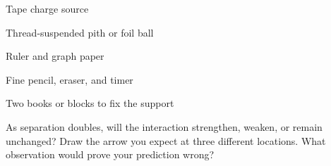 \newcommand{\fieldcomparison}{%
\begin{center}
\begin{tikzpicture}[x=.92cm,y=.92cm,line cap=round,
  arrow/.style={-{Latex[length=1.5mm]},black!72,line width=.42pt},
  ghost/.style={black!28,line width=.3pt,densely dashed}]
  \node[font=\bfseries\small] at (-3.58,1.52){A. Raw samples};
  \draw[step=.44cm,black!15,line width=.22pt](-5.20,-1.24)grid(-1.94,1.23);
  \fill (-3.57,0)circle(.15);\node[white,font=\tiny]at(-3.57,0){+};
  \foreach \a/\len in {0/.74,45/.65,90/.70,135/.59,180/.75,225/.62,270/.68,315/.72}{
    \fill[black!38]({-3.57+1.18*cos(\a)},{1.18*sin(\a)})circle(.025);
    \draw[arrow]({-3.57+.54*cos(\a)},{.54*sin(\a)})
      --({-3.57+(\len+0.54)*cos(\a)},{(\len+0.54)*sin(\a)});}

  \draw[black!26](0,-1.40)--(0,1.63);
  \node[font=\bfseries\small] at (2.10,1.52){B. Connected convention};
  \fill (2.10,0)circle(.15);\node[white,font=\tiny]at(2.10,0){+};
  \foreach \a in {0,45,...,315}{
    \draw[arrow]({2.10+.32*cos(\a)},{.32*sin(\a)})
      --({2.10+1.26*cos(\a)},{1.26*sin(\a)});
    \draw[ghost]({2.10+.22*cos(\a)},{.22*sin(\a)})
      --({2.10+1.43*cos(\a)},{1.43*sin(\a)});}
  \node[font=\scriptsize,align=center] at (2.10,-1.58)
    {Lines summarize the arrows;\\they are not tracks or strands.};
  \node[font=\scriptsize,align=center] at (-3.57,-1.58)
    {Keep measured variation visible.\\Do not ``repair'' data by eye.};
\end{tikzpicture}
\end{center}}


\rolecard

\begin{materials}
\item Tape charge source
\item Thread-suspended pith or foil ball
\item Ruler and graph paper
\item Fine pencil, eraser, and timer
\item Two books or blocks to fix the support
\end{materials}

\begin{predict}
As separation doubles, will the interaction strengthen, weaken, or remain
unchanged? Draw the arrow you expect at three different locations. What
observation would prove your prediction wrong?
\end{predict}

